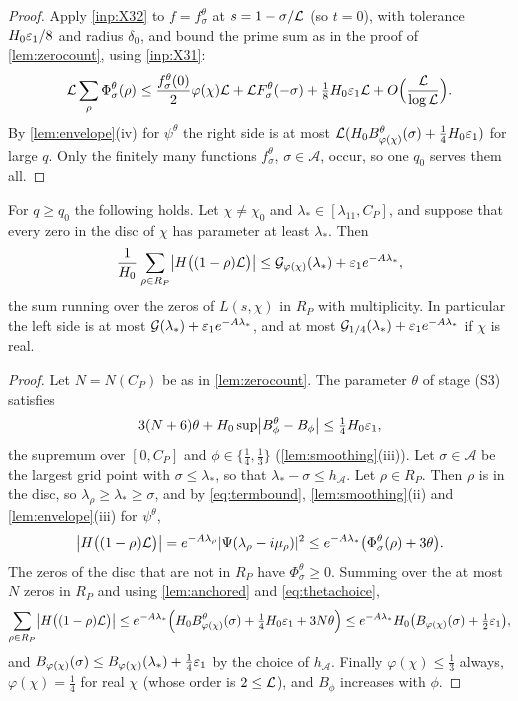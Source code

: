 \begin{proof}
Apply \cref{inp:X32} to $f=f^\theta_\sigma$ at $s=1-\sigma/\mathcal{L}$ (so $t=0$), with tolerance $H_0\varepsilon_1/8$ and
radius $\delta_0$, and bound the prime sum as in the proof of \cref{lem:zerocount}, using
\cref{inp:X31}:
\[
  \mathcal{L}\sum_{\rho}\Phi^\theta_\sigma(\rho)\le\frac{f^\theta_\sigma(0)}2\varphi(\chi)\mathcal{L}+\mathcal{L} F^\theta_\sigma(-\sigma)
  +\tfrac18H_0\varepsilon_1\mathcal{L}+O\Bigl(\frac{\mathcal{L}}{\log\mathcal{L}}\Bigr).
\]
By \cref{lem:envelope}(iv) for $\psi^\theta$ the right side is at most
$\mathcal{L}(H_0B^\theta_{\varphi(\chi)}(\sigma)+\frac14H_0\varepsilon_1)$ for large $q$. Only the finitely many functions
$f^\theta_\sigma$, $\sigma\in\mathcal A$, occur, so one $q_0$ serves them all.
\end{proof}

\begin{proposition}\label{prop:envelope}
For $q\ge q_0$ the following holds. Let $\chi\ne\chi_0$ and $\lambda_*\in[\lambda_{11},C_P]$, and suppose that
every zero in the disc of $\chi$ has parameter at least $\lambda_*$. Then
\[
  \frac1{H_0}\sum_{\rho\in R_P}\bigl|H\bigl((1-\rho)\mathcal{L}\bigr)\bigr|\le
  \mathcal G_{\varphi(\chi)}(\lambda_*)+\varepsilon_1e^{-A\lambda_*},
\]
the sum running over the zeros of $L(s,\chi)$ in $R_P$ with multiplicity. In particular the
left side is at most $\mathcal G(\lambda_*)+\varepsilon_1e^{-A\lambda_*}$, and at most
$\mathcal G_{1/4}(\lambda_*)+\varepsilon_1e^{-A\lambda_*}$ if $\chi$ is real.
\end{proposition}

\begin{proof}
Let $N=N(C_P)$ be as in \cref{lem:zerocount}. The parameter $\theta$ of stage (S3) satisfies
\begin{equation}\label{eq:thetachoice}
  3(N+6)\theta+H_0\sup\bigl|B^\theta_\phi-B_\phi\bigr|\le\tfrac14H_0\varepsilon_1,
\end{equation}
the supremum over $[0,C_P]$ and $\phi\in\{\frac14,\frac13\}$ (\cref{lem:smoothing}(iii)). Let
$\sigma\in\mathcal A$ be the largest grid point with $\sigma\le\lambda_*$, so that $\lambda_*-\sigma\le h_{\mathcal A}$. Let
$\rho\in R_P$. Then $\rho$ is in the disc, so $\lambda_\rho\ge\lambda_*\ge\sigma$, and by \eqref{eq:termbound},
\cref{lem:smoothing}(ii) and \cref{lem:envelope}(iii) for $\psi^\theta$,
\[
  \bigl|H\bigl((1-\rho)\mathcal{L}\bigr)\bigr|=e^{-A\lambda_\rho}|\Psi(\lambda_\rho-i\mu_\rho)|^2
  \le e^{-A\lambda_*}\bigl(\Phi^\theta_\sigma(\rho)+3\theta\bigr).
\]
The zeros of the disc that are not in $R_P$ have $\Phi^\theta_\sigma\ge0$. Summing over the at most $N$
zeros in $R_P$ and using \cref{lem:anchored} and \eqref{eq:thetachoice},
\[
  \sum_{\rho\in R_P}\bigl|H\bigl((1-\rho)\mathcal{L}\bigr)\bigr|\le
  e^{-A\lambda_*}\Bigl(H_0B^\theta_{\varphi(\chi)}(\sigma)+\tfrac14H_0\varepsilon_1+3N\theta\Bigr)
  \le e^{-A\lambda_*}H_0\bigl(B_{\varphi(\chi)}(\sigma)+\tfrac12\varepsilon_1\bigr),
\]
and $B_{\varphi(\chi)}(\sigma)\le B_{\varphi(\chi)}(\lambda_*)+\frac14\varepsilon_1$ by the choice of $h_{\mathcal A}$. Finally
$\varphi(\chi)\le\frac13$ always, $\varphi(\chi)=\frac14$ for real $\chi$ (whose order is $2\le\mathcal{L}$), and $B_\phi$
increases with $\phi$.
\end{proof}

